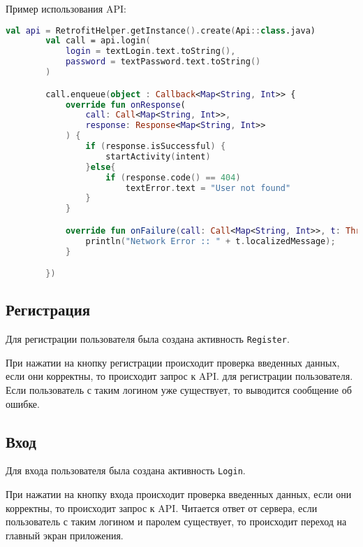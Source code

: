 Пример использования API:

\begin{lstlisting}[language=Kotlin, caption=\leftline{Пример использования API}, label=lst:ApiExample]
val api = RetrofitHelper.getInstance().create(Api::class.java)
        val call = api.login(
            login = textLogin.text.toString(),
            password = textPassword.text.toString()
        )

        call.enqueue(object : Callback<Map<String, Int>> {
            override fun onResponse(
                call: Call<Map<String, Int>>,
                response: Response<Map<String, Int>>
            ) {
                if (response.isSuccessful) {
                    startActivity(intent)
                }else{
                    if (response.code() == 404)
                        textError.text = "User not found"
                }
            }

            override fun onFailure(call: Call<Map<String, Int>>, t: Throwable) {
                println("Network Error :: " + t.localizedMessage);
            }

        })
\end{lstlisting}

\subsection{Регистрация}

Для регистрации пользователя была создана активность \texttt{Register}.

При нажатии на кнопку регистрации происходит проверка введенных данных, если они корректны, то происходит запрос к API.
для регистрации пользователя.
Если пользователь с таким логином уже существует, то выводится сообщение об ошибке.

\subsection{Вход}

Для входа пользователя была создана активность \texttt{Login}.


При нажатии на кнопку входа происходит проверка введенных данных, если они корректны, то происходит запрос к API.
Читается ответ от сервера, если пользователь с таким логином и паролем существует, то происходит переход на главный
экран приложения.


